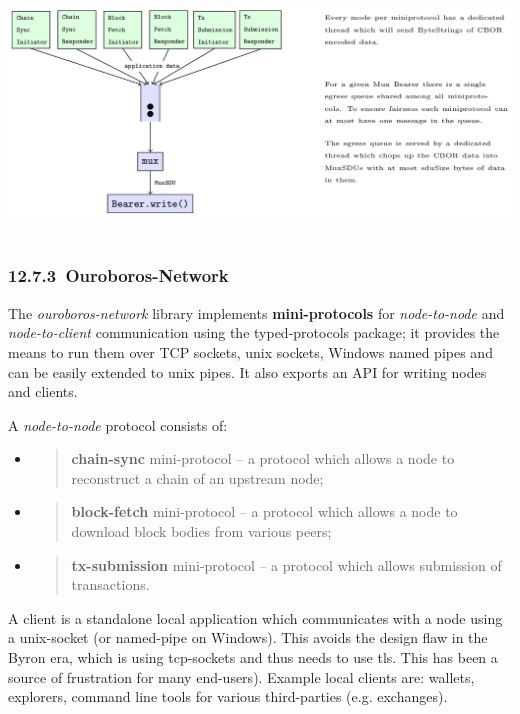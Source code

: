 \documentclass[11pt,a4paper]{article}
\begin{document}
~\includegraphics[width=6.27083in,height=2.59722in]{./media/image6.png}

\hypertarget{ouroboros-network}{%
\subsubsection{​12.7.3​~Ouroboros-Network}\label{ouroboros-network}}

The \emph{ouroboros-network} library implements \textbf{mini-protocols}
for \emph{node-to-node} and \emph{node-to-client} communication using
the typed-protocols package; it provides the means to run them over TCP
sockets, unix sockets, Windows named pipes and can be easily extended to
unix pipes. It also exports an API for writing nodes and clients.

A \emph{node-to-node} protocol consists of:

\begin{itemize}
\item
  \begin{quote}
  \textbf{chain-sync} mini-protocol -- a protocol which allows a node to
  reconstruct a chain of an upstream node;
  \end{quote}
\item
  \begin{quote}
  \textbf{block-fetch} mini-protocol -- a protocol which allows a node
  to download block bodies from various peers;
  \end{quote}
\item
  \begin{quote}
  \textbf{tx-submission} mini-protocol -- a protocol which allows
  submission of transactions.
  \end{quote}
\end{itemize}

A client is a standalone local application which communicates with a
node using a unix-socket (or named-pipe on Windows). This avoids the
design flaw in the Byron era, which is using tcp-sockets and thus needs
to use tls. This has been a source of frustration for many end-users).
Example local clients are: wallets, explorers, command line tools for
various third-parties (e.g. exchanges).
\end{document}
